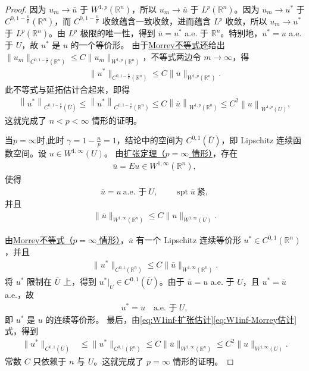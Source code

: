 \documentclass[../../main.tex]{subfiles}
\begin{document}
\begin{proof}
因为 $u_{m}\to\overline{u}$ 于 $W^{1,p}(\mathbb{R}^{n})$，所以 $u_{m}\to\overline{u}$ 于 $L^{p}(\mathbb{R}^{n})$。因为 $u_{m}\to u^{*}$ 于 $C^{0,1-\frac{n}{p}}(\mathbb{R}^{n})$，而 $C^{0,1-\frac{n}{p}}$ 收敛蕴含一致收敛，进而蕴含 $L^{p}$ 收敛，所以 $u_{m}\to u^{*}$ 于 $L^{p}(\mathbb{R}^{n})$。由 $L^{p}$ 极限的唯一性，得到 $\overline{u}=u^{*}$ a.e. 于 $\mathbb{R}^{n}$。特别地，$u^{*}=u$ a.e. 于 $U$，故 $u^{*}$ 是 $u$ 的一个等价形。
由于\hyperref[theorem:Morrey不等式]{Morrey不等式}还给出 $\|u_{m}\|_{C^{0,1-\frac{n}{p}}(\mathbb{R}^{n})}\leqslant C\|u_{m}\|_{W^{1,p}(\mathbb{R}^{n})}$，不等式两边令 $m\to\infty$，得
\begin{align*}
\|u^{*}\|_{C^{0,1-\frac{n}{p}}(\mathbb{R}^{n})}\leqslant C\|\overline{u}\|_{W^{1,p}(\mathbb{R}^{n})}.
\end{align*}
此不等式与延拓估计合起来，即得
\begin{align*}
\left\| u^* \right\| _{C^{0,1-\frac{n}{p}}(\overline{U})}\leqslant \left\| u^* \right\| _{C^{0,1-\frac{n}{p}}\left( \mathbb{R} ^n \right)}\leqslant C\left\| \overline{u} \right\| _{W^{1,p}\left( \mathbb{R} ^n \right)}\leqslant C^2\left\| u \right\| _{W^{1,p}\left( U \right)},
\end{align*}
这就完成了 $n<p<\infty$ 情形的证明。

当\(p=\infty\)时,此时 \(\gamma=1-\frac{n}{p}=1\)，结论中的空间为 \(C^{0,1}(\overline U)\)，即 Lipschitz 连续函数空间。设 \(u\in W^{1,\infty}(U)\)。
由\hyperref[theorem:ch05-扩张定理]{扩张定理（\(p=\infty\) 情形）}，存在
\begin{align*}
\overline u=Eu\in W^{1,\infty}(\mathbb R^n),
\end{align*}
使得
\begin{align*}
\overline u=u\ \text{a.e. 于}\ U,\qquad \operatorname{spt}\overline u\ \text{紧},
\end{align*}
并且
\begin{align}\label{eq:W1inf-扩张估计}
\|\overline u\|_{W^{1,\infty}(\mathbb R^n)}
\leqslant C\|u\|_{W^{1,\infty}(U)}.
\end{align}

由\hyperref[theorem:Morrey不等式]{Morrey不等式（\(p=\infty\) 情形）}，\(\overline u\) 有一个 Lipschitz 连续等价形 \(u^*\in C^{0,1}(\mathbb R^n)\)，并且
\begin{align}\label{eq:W1inf-Morrey估计}
\|u^*\|_{C^{0,1}(\mathbb R^n)}
\leqslant C\|\overline u\|_{W^{1,\infty}(\mathbb R^n)}.
\end{align}
将 \(u^*\) 限制在 \(\overline U\) 上，得到 \(u^*|_{\overline U}\in C^{0,1}(\overline U)\)。由于 \(\overline u=u\) a.e. 于 \(U\)，且 \(u^*=\overline u\) a.e.，故
\begin{align*}
u^*=u\quad\text{a.e. 于}\ U,
\end{align*}
即 \(u^*\) 是 \(u\) 的连续等价形。
最后，由\eqref{eq:W1inf-扩张估计}\eqref{eq:W1inf-Morrey估计}式，得到
\begin{align*}
\|u^*\|_{C^{0,1}(\overline U)}
&\leqslant \|u^*\|_{C^{0,1}(\mathbb R^n)}
\leqslant C\|\overline u\|_{W^{1,\infty}(\mathbb R^n)}
\leqslant C^2\|u\|_{W^{1,\infty}(U)}.
\end{align*}
常数 \(C\) 只依赖于 \(n\) 与 \(U\)。这就完成了 \(p=\infty\) 情形的证明。
\end{proof}
\end{document}
